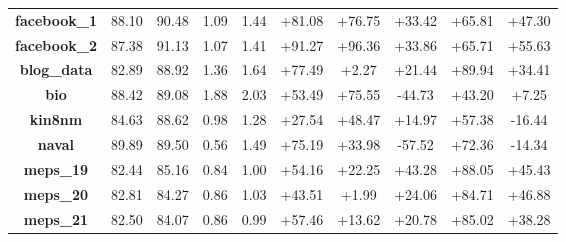 \documentclass{article}
\begin{document}
\begin{table}[tbp]
{\begin{tabular}{cccccccccc}
    \midrule
    \textbf{facebook\_1} & 88.10  & 90.48  & 1.09  & 1.44  & \textcolor[rgb]{ 0,  .502,  0}{+81.08} & \textcolor[rgb]{ 0,  .502,  0}{+76.75} & \textcolor[rgb]{ 0,  .502,  0}{+33.42} & \textcolor[rgb]{ 0,  .502,  0}{+65.81} & \textcolor[rgb]{ 0,  .502,  0}{+47.30} \\
    \textbf{facebook\_2} & 87.38  & 91.13  & 1.07  & 1.41  & \textcolor[rgb]{ 0,  .502,  0}{+91.27} & \textcolor[rgb]{ 0,  .502,  0}{+96.36} & \textcolor[rgb]{ 0,  .502,  0}{+33.86} & \textcolor[rgb]{ 0,  .502,  0}{+65.71} & \textcolor[rgb]{ 0,  .502,  0}{+55.63} \\
    \textbf{blog\_data} & 82.89  & 88.92  & 1.36  & 1.64  & \textcolor[rgb]{ 0,  .502,  0}{+77.49} & \textcolor[rgb]{ 0,  .502,  0}{+2.27} & \textcolor[rgb]{ 0,  .502,  0}{+21.44} & \textcolor[rgb]{ 0,  .502,  0}{+89.94} & \textcolor[rgb]{ 0,  .502,  0}{+34.41} \\
    \textbf{bio} & 88.42  & 89.08  & 1.88  & 2.03  & \textcolor[rgb]{ 0,  .502,  0}{+53.49} & \textcolor[rgb]{ 0,  .502,  0}{+75.55} & \textcolor[rgb]{ 1,  0,  0}{-44.73} & \textcolor[rgb]{ 0,  .502,  0}{+43.20} & \textcolor[rgb]{ 0,  .502,  0}{+7.25} \\
    \textbf{kin8nm} & 84.63  & 88.62  & 0.98  & 1.28  & \textcolor[rgb]{ 0,  .502,  0}{+27.54} & \textcolor[rgb]{ 0,  .502,  0}{+48.47} & \textcolor[rgb]{ 0,  .502,  0}{+14.97} & \textcolor[rgb]{ 0,  .502,  0}{+57.38} & \textcolor[rgb]{ 1,  0,  0}{-16.44} \\
    \textbf{naval} & 89.89  & 89.50  & 0.56  & 1.49  & \textcolor[rgb]{ 0,  .502,  0}{+75.19} & \textcolor[rgb]{ 0,  .502,  0}{+33.98} & \textcolor[rgb]{ 1,  0,  0}{-57.52} & \textcolor[rgb]{ 0,  .502,  0}{+72.36} & \textcolor[rgb]{ 1,  0,  0}{-14.34} \\
    \textbf{meps\_19} & 82.44  & 85.16  & 0.84  & 1.00  & \textcolor[rgb]{ 0,  .502,  0}{+54.16} & \textcolor[rgb]{ 0,  .502,  0}{+22.25} & \textcolor[rgb]{ 0,  .502,  0}{+43.28} & \textcolor[rgb]{ 0,  .502,  0}{+88.05} & \textcolor[rgb]{ 0,  .502,  0}{+45.43} \\
    \textbf{meps\_20} & 82.81  & 84.27  & 0.86  & 1.03  & \textcolor[rgb]{ 0,  .502,  0}{+43.51} & \textcolor[rgb]{ 0,  .502,  0}{+1.99} & \textcolor[rgb]{ 0,  .502,  0}{+24.06} & \textcolor[rgb]{ 0,  .502,  0}{+84.71} & \textcolor[rgb]{ 0,  .502,  0}{+46.88} \\
    \textbf{meps\_21} & 82.50  & 84.07  & 0.86  & 0.99  & \textcolor[rgb]{ 0,  .502,  0}{+57.46} & \textcolor[rgb]{ 0,  .502,  0}{+13.62} & \textcolor[rgb]{ 0,  .502,  0}{+20.78} & \textcolor[rgb]{ 0,  .502,  0}{+85.02} & \textcolor[rgb]{ 0,  .502,  0}{+38.28} \\
    
    
    
    \bottomrule[1.1pt]

    \end{tabular}%
    }
  \label{tab:real_pinball_results}%
\end{table}%
\end{document}
